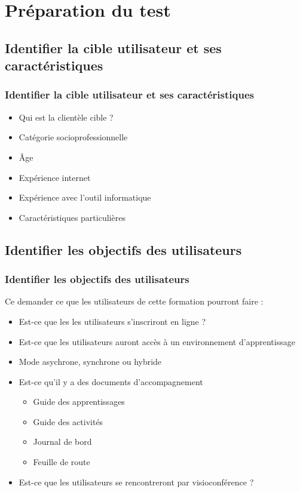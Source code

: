 	\section{Préparation du test} 
	
		
		
	\subsection{Identifier la cible utilisateur et ses caractéristiques} 
		\begin{frame}[allowframebreaks]
		\frametitle{Identifier la cible utilisateur et ses caractéristiques}
			\begin {itemize}
				      \item Qui est la clientèle cible ?
				      \item Catégorie socioprofessionnelle
					\item Âge
					\item Expérience internet
					\item Expérience avec l’outil informatique
					\item Caractéristiques particulières
			\end{itemize}
		\end{frame} 
		
	\subsection{Identifier les objectifs des utilisateurs} 
		\begin{frame}[allowframebreaks]
		\frametitle{Identifier les objectifs des utilisateurs}
		Ce demander ce que les utilisateurs de cette formation pourront faire :
			\begin {itemize}
				\item Est-ce que les les utilisateurs s’inscriront en ligne ?
				\item Est-ce que les utilisateurs auront accès à un environnement d’apprentissage
				\item Mode asychrone, synchrone ou hybride
				\item Est-ce qu'il y a des documents d’accompagnement
				\begin {itemize}
					\item Guide des apprentissages
					\item Guide des activités
					\item Journal de bord
					\item Feuille de route
				\end{itemize}
					\item Est-ce que les utilisateurs se rencontreront par visioconférence ?

			\end{itemize}
		\end{frame}
		
